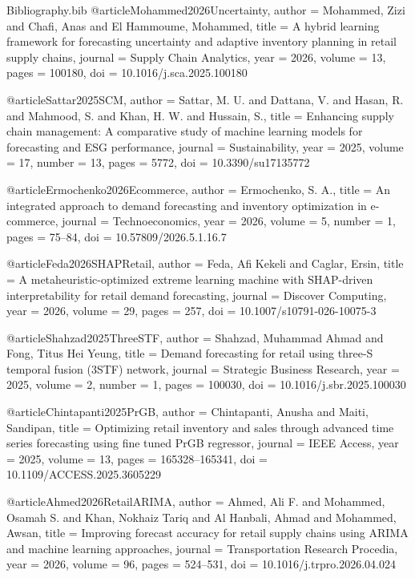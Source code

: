 \begin{filecontents*}{Bibliography.bib}
@article{Mohammed2026Uncertainty,
  author  = {Mohammed, Zizi and Chafi, Anas and El Hammoume, Mohammed},
  title   = {A hybrid learning framework for forecasting uncertainty and adaptive inventory planning in retail supply chains},
  journal = {Supply Chain Analytics},
  year    = {2026},
  volume  = {13},
  pages   = {100180},
  doi     = {10.1016/j.sca.2025.100180}
}

@article{Sattar2025SCM,
  author  = {Sattar, M. U. and Dattana, V. and Hasan, R. and Mahmood, S. and Khan, H. W. and Hussain, S.},
  title   = {Enhancing supply chain management: A comparative study of machine learning models for forecasting and ESG performance},
  journal = {Sustainability},
  year    = {2025},
  volume  = {17},
  number  = {13},
  pages   = {5772},
  doi     = {10.3390/su17135772}
}

@article{Ermochenko2026Ecommerce,
  author  = {Ermochenko, S. A.},
  title   = {An integrated approach to demand forecasting and inventory optimization in e-commerce},
  journal = {Technoeconomics},
  year    = {2026},
  volume  = {5},
  number  = {1},
  pages   = {75--84},
  doi     = {10.57809/2026.5.1.16.7}
}

@article{Feda2026SHAPRetail,
  author  = {Feda, Afi Kekeli and Caglar, Ersin},
  title   = {A metaheuristic-optimized extreme learning machine with SHAP-driven interpretability for retail demand forecasting},
  journal = {Discover Computing},
  year    = {2026},
  volume  = {29},
  pages   = {257},
  doi     = {10.1007/s10791-026-10075-3}
}

@article{Shahzad2025ThreeSTF,
  author  = {Shahzad, Muhammad Ahmad and Fong, Titus Hei Yeung},
  title   = {Demand forecasting for retail using three-S temporal fusion (3STF) network},
  journal = {Strategic Business Research},
  year    = {2025},
  volume  = {2},
  number  = {1},
  pages   = {100030},
  doi     = {10.1016/j.sbr.2025.100030}
}

@article{Chintapanti2025PrGB,
  author  = {Chintapanti, Anusha and Maiti, Sandipan},
  title   = {Optimizing retail inventory and sales through advanced time series forecasting using fine tuned PrGB regressor},
  journal = {IEEE Access},
  year    = {2025},
  volume  = {13},
  pages   = {165328--165341},
  doi     = {10.1109/ACCESS.2025.3605229}
}

@article{Ahmed2026RetailARIMA,
  author  = {Ahmed, Ali F. and Mohammed, Osamah S. and Khan, Nokhaiz Tariq and Al Hanbali, Ahmad and Mohammed, Awsan},
  title   = {Improving forecast accuracy for retail supply chains using ARIMA and machine learning approaches},
  journal = {Transportation Research Procedia},
  year    = {2026},
  volume  = {96},
  pages   = {524--531},
  doi     = {10.1016/j.trpro.2026.04.024}
}


\end{filecontents*}
